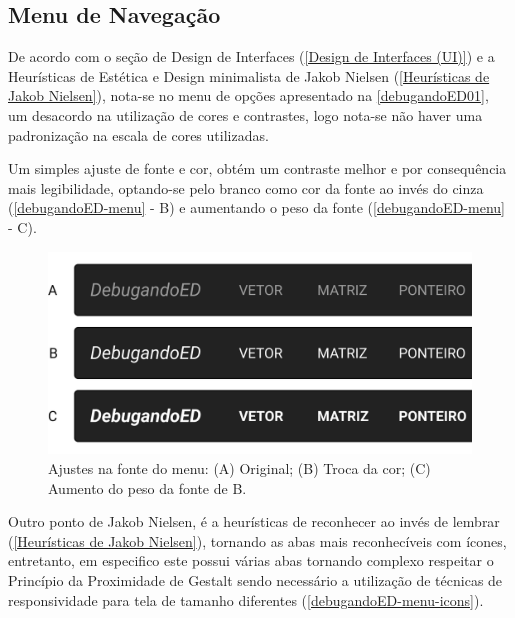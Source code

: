 \subsection{Menu de Navegação}
\label{Menu_de_Navegação}

De acordo com o seção de Design de Interfaces (\autoref{Design de Interfaces (UI)}) e a Heurísticas de Estética e Design minimalista de Jakob Nielsen (\autoref{Heurísticas de Jakob Nielsen}), nota-se no menu de opções apresentado na \autoref{debugandoED01}, um desacordo na utilização de cores e contrastes, logo nota-se não haver uma padronização na escala de cores utilizadas.
    
Um simples ajuste de fonte e cor, obtém um contraste melhor e por consequência mais legibilidade, optando-se pelo branco como cor da fonte ao invés do cinza (\autoref{debugandoED-menu} - B) e aumentando o peso da fonte (\autoref{debugandoED-menu} - C).
    
    \begin{figure}[htb]
        \begin{center}
    	    \includegraphics[scale=1]{figs/debugandoED-menu.png}
    	\end{center}
        \caption{\label{debugandoED-menu}Ajustes na fonte do menu: (A) Original; (B) Troca da cor; (C) Aumento do peso da fonte de B.}
    \end{figure}
    
 Outro ponto de Jakob Nielsen, é a heurísticas de reconhecer ao invés de lembrar (\autoref{Heurísticas de Jakob Nielsen}), tornando as abas mais reconhecíveis com ícones, entretanto, em especifico este possui várias abas tornando complexo respeitar o Princípio da Proximidade de Gestalt sendo necessário a utilização de técnicas de responsividade para tela de tamanho diferentes (\autoref{debugandoED-menu-icons}).
 
